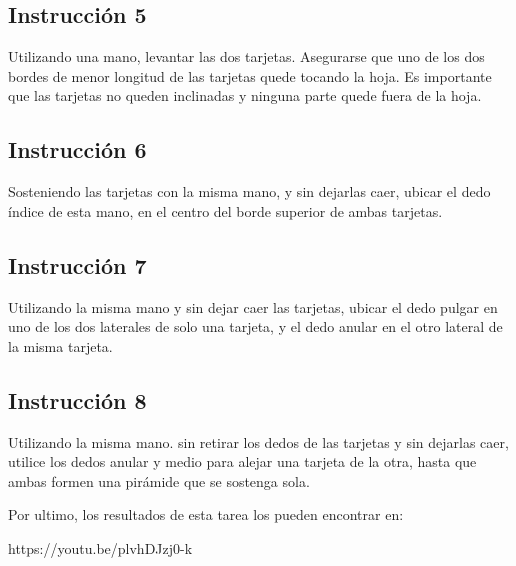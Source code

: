 \documentclass{article}
\begin{document}
\subsection{Instrucción 5}
Utilizando una mano, levantar las dos tarjetas. Asegurarse que uno de los dos bordes de menor longitud de las tarjetas quede tocando la hoja. Es importante que las tarjetas no queden inclinadas y ninguna parte quede fuera de la hoja.
\subsection{Instrucción 6}
Sosteniendo las tarjetas con la misma mano, y sin dejarlas caer, ubicar el dedo índice de esta mano, en el centro del borde superior de ambas tarjetas.
\subsection{Instrucción 7}
Utilizando la misma mano y sin dejar caer las tarjetas, ubicar el dedo pulgar en uno de los dos laterales de solo una tarjeta, y el dedo anular en el otro lateral de la misma tarjeta.
\subsection{Instrucción 8}
Utilizando la misma mano. sin retirar los dedos de las tarjetas y sin dejarlas caer, utilice los dedos anular y medio para alejar una tarjeta de la otra, hasta que ambas formen una pirámide que se sostenga sola.

\newpage
Por ultimo, los resultados de esta tarea los pueden encontrar en:

https://youtu.be/plvhDJzj0-k
\end{document}
